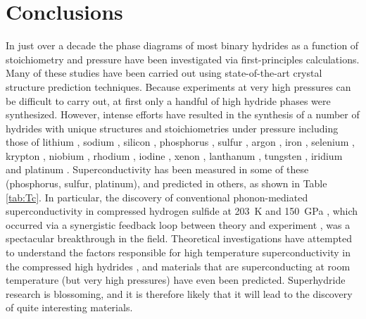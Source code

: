 \documentclass[12pt,letterpaper,oneside]{article}
\begin{document}
\section{Conclusions}
%
In just over a decade the phase diagrams of most binary hydrides as a function of stoichiometry and pressure have been investigated via first-principles calculations. Many of these studies have been carried out using state-of-the-art crystal structure prediction techniques. Because experiments at very high pressures can be difficult to carry out, at first only a handful of high hydride phases were synthesized. However, intense efforts have resulted in the synthesis of a number of hydrides with unique structures and stoichiometries under pressure including those of lithium \cite{Pepin:2015a}, sodium \cite{Struzhkin:2016}, silicon \cite{Strobel:2009a,Wang:2009-Si}, phosphorus \cite{Drozdov:2015-P}, sulfur \cite{Drozdov:2015a}, argon \cite{Loubeyre:1994a, Ji-Ar:2017a}, iron \cite{Pepin:2014,Pepin:2017a}, selenium \cite{Pace:2017a,Zhang:2018-Se}, krypton \cite{Kleppe:2014a}, niobium \cite{Liu:2017}, rhodium \cite{Li:2011a}, iodine \cite{Binns:2018a}, xenon \cite{Somayazulu:2010a, Somayazulu:2015a}, lanthanum \cite{Geballe:2018a}, tungsten \cite{Strobel:2009a,Scheler:2013b}, iridium \cite{Scheler:2013c} and platinum \cite{Scheler:2011a}. Superconductivity has been measured in some of these (phosphorus, sulfur, platinum), and predicted in others, as shown in Table \ref{tab:Tc}. %
In particular, the discovery of conventional phonon-mediated superconductivity in compressed hydrogen sulfide at 203~K and 150~GPa \cite{Drozdov:2015a}, which occurred via a synergistic feedback loop between theory and experiment \cite{Yao-S-review:2018}, was a spectacular breakthrough in the field. Theoretical investigations have attempted to understand the factors responsible for high temperature superconductivity in the compressed high hydrides \cite{Peng:Sc-2017,Tanaka:2017a}, and  materials that are superconducting at room temperature (but very high pressures) \cite{Liu:2017-La-Y,Peng:Sc-2017} have even been predicted. Superhydride research is blossoming, and it is therefore likely that it will lead to the discovery of quite interesting materials. 


\pagebreak
\end{document}
